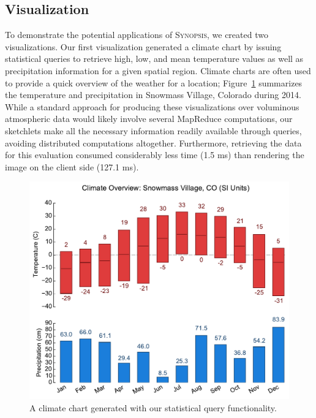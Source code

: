 \subsection{Visualization}
To demonstrate the potential applications of \textsc{Synopsis}, we created two visualizations. Our first visualization generated a climate chart by issuing statistical queries to retrieve high, low, and mean temperature values as well as precipitation information for a given spatial region. Climate charts are often used to provide a quick overview of the weather for a location; Figure~\ref{fig:climate} summarizes the temperature and precipitation in Snowmass Village, Colorado during 2014. While a standard approach for producing these visualizations over voluminous atmospheric data would likely involve several MapReduce computations, our sketchlets make all the necessary information readily available through queries, avoiding distributed computations altogether. Furthermore, retrieving the data for this evaluation consumed considerably less time (1.5 ms) than rendering the image on the client side (127.1 ms).

\begin{figure}[h]
    \centerline{\includegraphics[width=\linewidth]{figures/climate-snowmass.pdf}}
    \caption{A climate chart generated with our statistical query functionality.}
    \label{fig:climate}
\end{figure}

